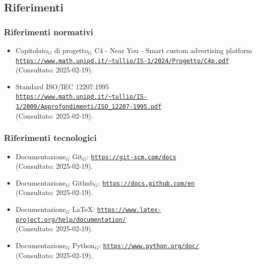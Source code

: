 \documentclass[10pt]{article}
\begin{document}
\begin{justify}
    \subsection{Riferimenti}
        \subsubsection{Riferimenti normativi}
        \begin{itemize}
            \item Capitolato$_G$ di progetto$_G$ C4 - Near You - Smart custom advertising platform\\ \textcolor{blue}{\texttt{\url{https://www.math.unipd.it/~tullio/IS-1/2024/Progetto/C4p.pdf}}}\\ 
              (Consultato: 2025-02-19).
            \item Standard ISO/IEC 12207:1995\\ \textcolor{blue}{\texttt{\url{https://www.math.unipd.it/~tullio/IS-1/2009/Approfondimenti/ISO_12207-1995.pdf}}}\\
              (Consultato: 2025-02-19).
        \end{itemize}
        \subsubsection{Riferimenti tecnologici}
        \begin{itemize}
            \item Documentazione$_G$ Git$_G$: \textcolor{blue}{\texttt{\url{https://git-scm.com/docs}}}\\
              (Consultato: 2025-02-19).
            \item Documentazione$_G$ Github$_G$: \textcolor{blue}{\texttt{\url{https://docs.github.com/en}}}\\
              (Consultato: 2025-02-19).
            \item Documentazione$_G$ \LaTeX: \textcolor{blue}{\texttt{\url{https://www.latex-project.org/help/documentation/}}}\\
              (Consultato: 2025-02-19).
            \item Documentazione$_G$ Python$_G$: \textcolor{blue}{\texttt{\url{https://www.python.org/doc/}}}\\
              (Consultato: 2025-02-19).
        \end{itemize}

\end{justify}
\end{document}
